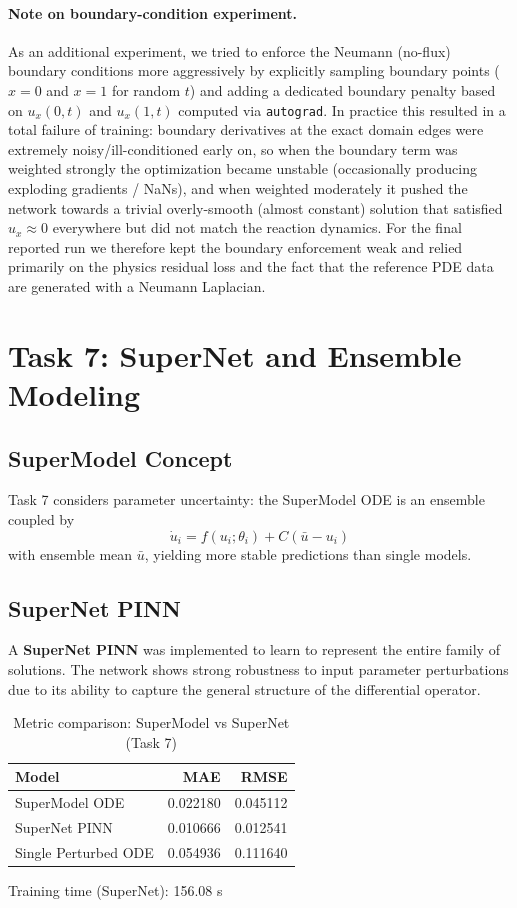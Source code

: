 \documentclass[a4paper,11pt]{article}
\begin{document}
\paragraph{Note on boundary-condition experiment.}
As an additional experiment, we tried to enforce the Neumann (no-flux) boundary conditions more aggressively by explicitly sampling boundary points ($x=0$ and $x=1$ for random $t$) and adding a dedicated boundary penalty based on $u_x(0,t)$ and $u_x(1,t)$ computed via \texttt{autograd}. In practice this resulted in a total failure of training: boundary derivatives at the exact domain edges were extremely noisy/ill-conditioned early on, so when the boundary term was weighted strongly the optimization became unstable (occasionally producing exploding gradients / NaNs), and when weighted moderately it pushed the network towards a trivial overly-smooth (almost constant) solution that satisfied $u_x\approx 0$ everywhere but did not match the reaction dynamics.
For the final reported run we therefore kept the boundary enforcement weak and relied primarily on the physics residual loss and the fact that the reference PDE data are generated with a Neumann Laplacian.

\section{Task 7: SuperNet and Ensemble Modeling}
\subsection{SuperModel Concept}
Task 7 considers parameter uncertainty: the SuperModel ODE is an ensemble coupled by
\begin{equation}
    \dot{u}_i = f(u_i; \theta_i) + C(\bar{u} - u_i)
\end{equation}
with ensemble mean $\bar{u}$, yielding more stable predictions than single models.

\subsection{SuperNet PINN}
A \textbf{SuperNet PINN} was implemented to learn to represent the entire family of solutions. The network shows strong robustness to input parameter perturbations due to its ability to capture the general structure of the differential operator.

\begin{table}[ht]
\centering
\caption{Metric comparison: SuperModel vs SuperNet (Task 7)}
\label{tab:supernet-metrics}
\begin{tabular}{lrr}
\toprule
Model & MAE & RMSE \\
\midrule
SuperModel ODE & 0.022180 & 0.045112 \\
SuperNet PINN & 0.010666 & 0.012541 \\
Single Perturbed ODE & 0.054936 & 0.111640 \\
\bottomrule
\end{tabular}
\vspace{4pt}
\par Training time (SuperNet): 156.08 s
\end{table}
\end{document}
